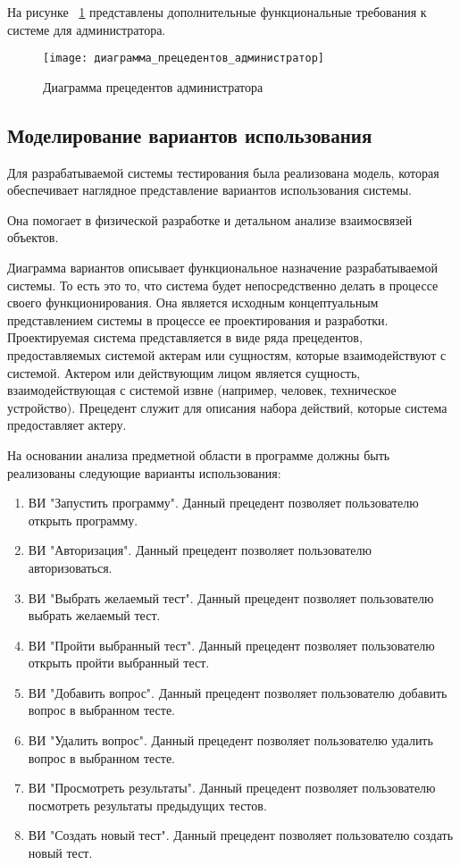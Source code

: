 \clearpage

На рисунке ~\ref{admin_precedent_diagram:image} представлены дополнительные функциональные требования к системе для администратора.

\begin{figure}[H]
	\texttt{[image: диаграмма\_прецедентов\_администратор]}
	\caption{Диаграмма прецедентов администратора}
	\label{admin_precedent_diagram:image}
\end{figure}

\subsection{Моделирование вариантов использования}

Для разрабатываемой системы тестирования была реализована модель, которая обеспечивает наглядное представление вариантов использования системы.

Она помогает в физической разработке и детальном анализе взаимосвязей объектов.

Диаграмма вариантов описывает функциональное назначение разрабатываемой системы. То есть это то, что система будет непосредственно делать в процессе своего функционирования. Она является исходным концептуальным представлением системы в процессе ее проектирования и разработки. Проектируемая система представляется в виде ряда прецедентов, предоставляемых системой актерам или сущностям, которые взаимодействуют с системой. Актером или действующим лицом является сущность, взаимодействующая с системой извне (например, человек, техническое устройство). Прецедент служит для описания набора действий, которые система предоставляет актеру.

На основании анализа предметной области в программе должны быть реализованы следующие варианты использования:
\begin{enumerate}
\item ВИ "Запустить программу". Данный прецедент позволяет пользователю открыть программу.
\item ВИ "Авторизация". Данный прецедент позволяет пользователю авторизоваться.
\item ВИ "Выбрать желаемый тест". Данный прецедент позволяет пользователю выбрать желаемый тест.
\item ВИ "Пройти выбранный тест". Данный прецедент позволяет пользователю открыть пройти выбранный тест.
\item ВИ "Добавить вопрос". Данный прецедент позволяет пользователю добавить вопрос в выбранном тесте.
\item ВИ "Удалить вопрос". Данный прецедент позволяет пользователю удалить вопрос в выбранном тесте.
\item ВИ "Просмотреть результаты". Данный прецедент позволяет пользователю посмотреть результаты предыдущих тестов.
\item ВИ "Создать новый тест". Данный прецедент позволяет пользователю создать новый тест.
\end{enumerate}

